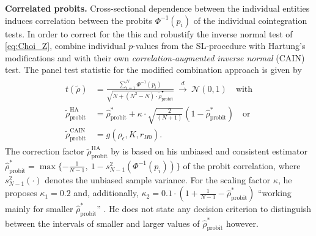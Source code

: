 \textbf{Correlated probits.} Cross-sectional dependence between the individual entities induces correlation between the probits $ \Phi^{-1} \left( p_i \right) $ of the individual cointegration tests. In order to correct for the this and robustify the inverse normal test of \eqref{eq:Choi_Z}, \citet{ArsovaOersal2020} combine individual $p$-values from the SL-procedure with Hartung's \citeyearpar{Hartung1999} modifications and with their own \textit{correlation-augmented inverse normal} (CAIN) test. The panel test statistic for the modified combination approach is given by
\begin{align} \label{eq:CAIN}
\begin{split}
	t(\tilde{\rho}) & = \frac{ \sum_{i=1}^{N} \Phi^{-1} \left( p_i \right) }{\sqrt{ N + \left( N^2-N \right) \cdot \tilde{\rho}^\bullet_\text{probit} }} \ \overset{d}{\longrightarrow} \ \mathcal{N}(0,1) \quad \text{with} \\ %
	\tilde{\rho}^{\text{HA}}_\text{probit} & = \hat{\rho}^*_\text{probit} + \kappa \cdot \sqrt{ \frac{2}{ \left( N+1 \right) }} \left( 1 - \hat{\rho}^*_\text{probit} \right)  \quad \text{or} \\
	\tilde{\rho}^{\text{CAIN}}_\text{probit} & = g\left( \rho_\epsilon, K, r_{H0} \right). 
\end{split}
\end{align}
The correction factor $ \tilde{\rho}^{\text{HA}}_\text{probit} $ by \citet{Hartung1999} is based on his unbiased and consistent estimator $ \hat{\rho}^*_\text{probit} = \max \lbrace - \frac{1}{N-1}, \ 1 - s_{N-1}^2 \left( \Phi^{-1} \left( p_i \right) \right) \rbrace $ of the probit correlation, where $ s_{N-1}^2(\cdot) $ denotes the unbiased sample variance. For the scaling factor $ \kappa $, he proposes $ \kappa_1 = 0.2 $ and, additionally, $ \kappa_2 = 0.1 \cdot \left( 1 + \frac{1}{N-1} - \hat{\rho}^*_\text{probit} \right) $ ``working mainly for smaller $ \hat{\rho}^*_\text{probit} $'' \citep[p.~853]{Hartung1999}. He does not state any decision criterion to distinguish between the intervals of smaller and larger values of $ \hat{\rho}^*_\text{probit} $ however.

